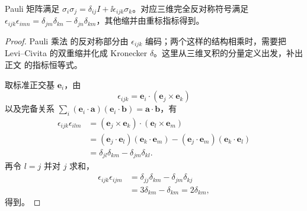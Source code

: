 \begin{lemma}
Pauli 矩阵满足 $\sigma_i\sigma_j=\delta_{ij}I+\ii\epsilon_{ijk}\sigma_k$。对应三维完全反对称符号满足 $\epsilon_{ijk}\epsilon_{imn}=\delta_{jm}\delta_{kn}-\delta_{jn}\delta_{km}$，其他缩并由重标指标得到。
\end{lemma}
\begin{proof}
Pauli 乘法 的反对称部分由 $\epsilon_{ijk}$ 编码；两个这样的结构相乘时，需要把 Levi--Civita 的双重缩并化成 Kronecker $\delta$。这里从三维叉积的分量定义出发，补出正文 的指标恒等式。



取标准正交基 $\mathbf e_i$，由
\begin{equation*}
 \epsilon_{ijk}=\mathbf e_i\cdot(\mathbf e_j\times\mathbf e_k)
\end{equation*}
以及完备关系 $\sum_i(\mathbf e_i\cdot\mathbf a)(\mathbf e_i\cdot\mathbf b)=\mathbf a\cdot\mathbf b$，有
\begin{align*}
 \epsilon_{ijk}\epsilon_{ilm}
 &= (\mathbf e_j\times\mathbf e_k)\cdot(\mathbf e_l\times\mathbf e_m)\\
 &= (\mathbf e_j\cdot\mathbf e_l)(\mathbf e_k\cdot\mathbf e_m)
 -(\mathbf e_j\cdot\mathbf e_m)(\mathbf e_k\cdot\mathbf e_l)\\
 &=\delta_{jl}\delta_{km}-\delta_{jm}\delta_{kl}.
\end{align*}
再令 $l=j$ 并对 $j$ 求和，
\begin{align*}
 \epsilon_{ijk}\epsilon_{ijm}
 &=\delta_{jj}\delta_{km}-\delta_{jm}\delta_{kj}\\
 &=3\delta_{km}-\delta_{km}=2\delta_{km},
\end{align*}
得到。
\end{proof}

